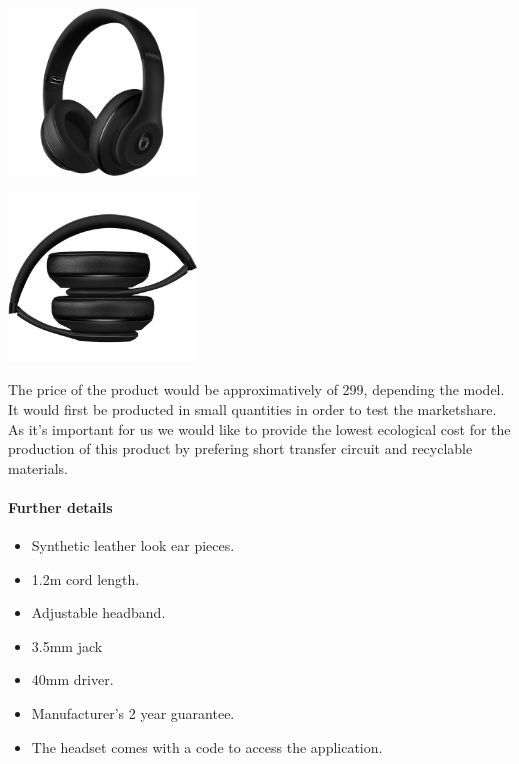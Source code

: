 \documentclass[12pt, a4paper]{article}
\newenvironment{Figure}
  {\par\medskip\noindent\minipage{\linewidth}}
  {\endminipage\par\medskip}
\newenvironment{Figure}
  {\par\medskip\noindent\minipage{\linewidth}}
{\endminipage\par\medskip}
\begin{document}
    \begin{multicols}{2}
        \begin{Figure}
        \centering
        \includegraphics[width=5cm]{pictures/casque1.png}
        \end{Figure}
        \begin{Figure}
        \centering
        \includegraphics[width=5cm]{pictures/casque2.png}
        \end{Figure}
    \end{multicols}

    The price of the product would be approximatively of 299\EUR , depending the model. It would first be producted in small quantities in order to test the marketshare. As it's important for us we would like to provide the lowest ecological cost for the production of this product by prefering short transfer circuit and recyclable materials.

    \paragraph{Further details}
    \begin{itemize}
        \item Synthetic leather look ear pieces.
        \item 1.2m cord length.
        \item Adjustable headband.
        \item 3.5mm jack
        \item 40mm driver.
        \item Manufacturer's 2 year guarantee.
        \item The headset comes with a code to access the application.
    \end{itemize}
\end{document}
